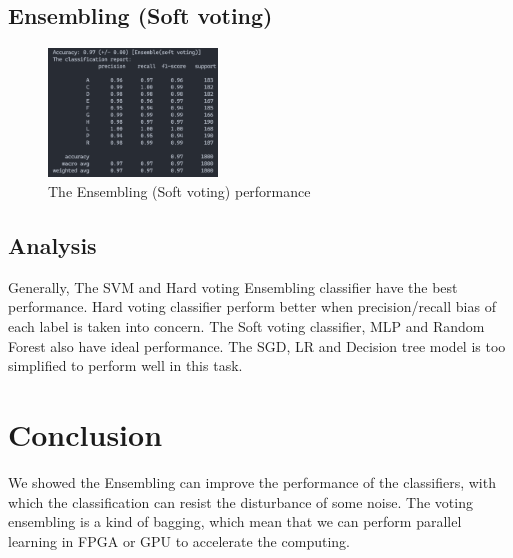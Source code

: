 \documentclass[11pt,en]{elegantpaper}
\begin{document}
\subsection*{Ensembling (Soft voting)}
\begin{figure}[H]
	\centering
	\includegraphics[width=0.4\textwidth]{image/svpf}
	\caption{The Ensembling (Soft voting) performance}
	\label{svpf}
\end{figure}

\subsection{Analysis}
Generally, The SVM and Hard voting Ensembling classifier have the best performance. Hard voting classifier perform better when precision/recall bias of each label is taken into concern. The Soft voting classifier, MLP and Random Forest also have ideal performance. The SGD, LR and Decision tree model is too simplified to perform well in this task. 

\section{Conclusion}
We showed the Ensembling can improve the performance of the classifiers, with which the classification can resist the disturbance of some noise. The voting ensembling is a kind of bagging, which mean that we can perform parallel learning in FPGA or GPU to accelerate the computing.



\end{document}
